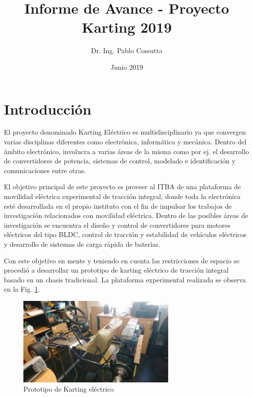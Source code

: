 \documentclass[a4paper]{article}
\title{Informe de Avance - Proyecto Karting 2019}
\author{Dr. Ing. Pablo Cossutta}
\date{Junio 2019}
\begin{document}
\maketitle
%
\section{Introducción}
El proyecto denominado Karting Eléctrico es multidisciplinario ya que convergen varias disciplinas diferentes como electrónica, informática y mecánica. Dentro del ámbito electrónico, involucra a varias áreas de la misma como por ej. el desarrollo de convertidores de potencia, sistemas de control, modelado e identificación y comunicaciones entre otras.

El objetivo principal de este proyecto es proveer al ITBA de una plataforma de movilidad eléctrica experimental de tracción integral, donde toda la electrónica esté desarrollada en el propio instituto con el fin de impulsar los trabajos de investigación relacionados con movilidad eléctrica. Dentro de las posibles áreas de investigación se encuentra el diseño y control de convertidores para motores eléctricos del tipo BLDC, control de tracción y estabilidad de vehículos eléctricos y desarrollo de sistemas de carga rápida de baterías.

Con este objetivo en mente y teniendo en cuenta las restricciones de espacio se procedió a desarrollar un prototipo de karting eléctrico de tracción integral basado en un chasis tradicional. La plataforma experimental realizada se observa en la Fig. \ref{fig:kart1}.
\begin{figure}[h]
    \centering
    \includegraphics[width=0.7\textwidth]{figs/kart1.jpg}
    \caption{Prototipo de Karting eléctrico}
    \label{fig:kart1}
\end{figure}
\end{document}
